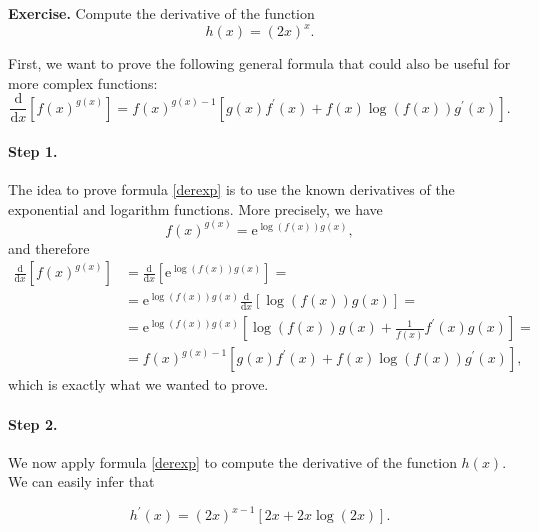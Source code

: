 \documentclass[a4paper,10 pt]{report}
\newcommand{\finalanswer}[1]{%
    \begin{finalAnswer}
    \[
        #1
    \]
    \end{finalAnswer}
}
\theoremstyle{definition}
\begin{document}
\begin{exerciseBox} \textbf{Exercise.} Compute the derivative of the function
\begin{equation*}h(x) = (2x)^x. \end{equation*}
\end{exerciseBox}

\begin{solutionBox} First, we want to prove the following general formula that could also be useful for more complex functions:
\begin{equation}\label{derexp} \frac{\mathrm{d}}{\mathrm{d}x} [f(x)^{g(x)}] = f(x)^{g(x) - 1} \left[g(x) f^\prime(x) + f(x) \log( f(x) ) g^\prime(x) \right]. \end{equation}

\paragraph{Step 1.} The idea to prove formula \eqref{derexp} is to use the known derivatives of the exponential and logarithm functions. More precisely, we have
\begin{equation*}f(x)^{g(x)} = \mathrm{e}^{ \log(f(x)) g(x)}, \end{equation*}
and therefore
\begin{equation*} \begin{aligned} \frac{\mathrm{d}}{\mathrm{d}x} [f(x)^{g(x)}] & = \frac{\mathrm{d}}{\mathrm{d}x}[\mathrm{e}^{ \log(f(x)) g(x) }]  =
\\[1em] & = \mathrm{e}^{ \log(f(x)) g(x)} \frac{\mathrm{d}}{\mathrm{d}x} \left[ \log(f(x)) g(x) \right] =
\\[1em] & =\mathrm{e}^{ \log(f(x)) g(x)} \left[ \log (f(x)) g(x) + \frac{1}{f(x)} f^\prime(x) g(x)  \right] =
\\[1em] & = f(x)^{g(x) - 1} \left[g(x) f^\prime(x) + f(x) \log( f(x) ) g^\prime(x) \right], \end{aligned} \end{equation*}
which is exactly what we wanted to prove.

\paragraph{Step 2.} We now apply formula \eqref{derexp} to compute the derivative of the function $h(x)$. We can easily infer that
\finalanswer{
h^\prime(x) = (2x)^{x-1} \left[ 2x + 2x \log(2x) \right].
} \end{solutionBox}
\end{document}
